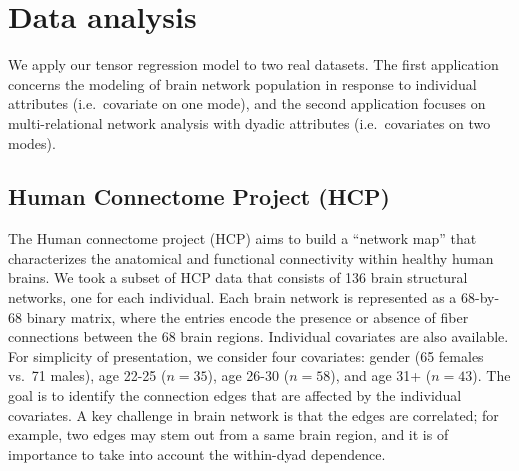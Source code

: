 \documentclass[twoside]{article}
\theoremstyle{plain}
\theoremstyle{definition}
\begin{document}
\section{Data analysis}
We apply our tensor regression model to two real datasets. The first application concerns the modeling of brain network population in response to individual attributes (i.e.\ covariate on one mode), and the second application focuses on multi-relational network analysis with dyadic attributes (i.e.\ covariates on two modes). 

\subsection{Human Connectome Project (HCP)}
The Human connectome project (HCP) aims to build a ``network map'' that characterizes the anatomical and functional connectivity within healthy human brains. 
We took a subset of HCP data that consists of 136 brain structural networks, one for each individual. Each brain network is represented as a 68-by-68 binary matrix, where the entries encode the presence or absence of fiber connections between the 68 brain regions. Individual covariates are also available. For simplicity of presentation, we consider four covariates: gender (65 females vs.\ 71 males), age 22-25 ($n=35$), age 26-30 ($n=58$), and age 31+ ($n=43$). The goal is to identify the connection edges that are affected by the individual covariates. A key challenge in brain network is that the edges are correlated; for example, two edges may stem out from a same brain region, and it is of importance to take into account the within-dyad dependence. 
\end{document}
